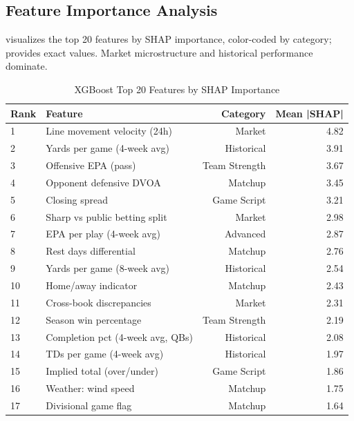 \subsection{Feature Importance Analysis}

 visualizes the top 20 features by SHAP importance, color-coded by category;  provides exact values. Market microstructure and historical performance dominate.



\begin{table}[htbp]
  \centering
  \caption{XGBoost Top 20 Features by SHAP Importance}
  \label{tab:xgboost-feature-importance-top20}
  \begin{tabular}{llrr}
    \toprule
    \textbf{Rank} & \textbf{Feature} & \textbf{Category} & \textbf{Mean |SHAP|} \\
    \midrule
    1 & Line movement velocity (24h) & Market & 4.82 \\
    2 & Yards per game (4-week avg) & Historical & 3.91 \\
    3 & Offensive EPA (pass) & Team Strength & 3.67 \\
    4 & Opponent defensive DVOA & Matchup & 3.45 \\
    5 & Closing spread & Game Script & 3.21 \\
    6 & Sharp vs public betting split & Market & 2.98 \\
    7 & EPA per play (4-week avg) & Advanced & 2.87 \\
    8 & Rest days differential & Matchup & 2.76 \\
    9 & Yards per game (8-week avg) & Historical & 2.54 \\
    10 & Home/away indicator & Matchup & 2.43 \\
    11 & Cross-book discrepancies & Market & 2.31 \\
    12 & Season win percentage & Team Strength & 2.19 \\
    13 & Completion pct (4-week avg, QBs) & Historical & 2.08 \\
    14 & TDs per game (4-week avg) & Historical & 1.97 \\
    15 & Implied total (over/under) & Game Script & 1.86 \\
    16 & Weather: wind speed & Matchup & 1.75 \\
    17 & Divisional game flag & Matchup & 1.64 \\

\end{tabular}
\end{table}
